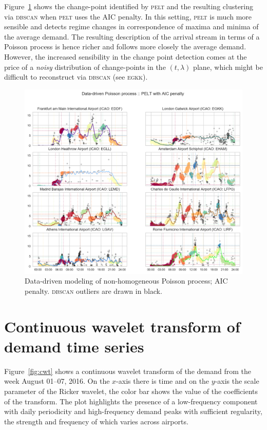 \documentclass[]{elsarticle}
\newcommand{\PELT}{\textsc{pelt}}
\newcommand{\DBSCAN}{\textsc{dbscan}}
\newcommand{\airp}[1]{\textcolor{#1}{\textsc{#1}}}
\begin{document}
  Figure~\ref{fig:DD_AIC} shows the change-point identified by \PELT{} and the resulting clustering via \DBSCAN{} when \PELT{} uses the \ac{AIC} penalty.
  In this setting, \PELT{} is much more sensible and detects regime changes in correspondence of maxima and minima of the average demand.
  The resulting description of the arrival stream in terms of a Poisson process is hence richer and follows more closely the average demand.
  However, the increased sensibility in the change point detection comes at the price of a \emph{noisy} distribution of change-points in the \((t,\lambda)\) plane, which might be difficult to reconstruct via \DBSCAN{} (see \airp{egkk}).

  \begin{figure}
      \includegraphics[width=\textwidth]{DDPoisson_AIC}
      \caption{Data-driven modeling of non-homogeneous Poisson process; \ac{AIC} penalty. \DBSCAN{} outliers are drawn in black.}\label{fig:DD_AIC}
  \end{figure}

\section{Continuous wavelet transform of demand time series}\label{sec:appc}

Figure~\ref{fig:cwt} shows a continuous wavelet transform of the demand from the week August 01--07, 2016.
On the \(x\)-axis there is time and on the \(y\)-axis the scale parameter of the Ricker wavelet, the color bar shows the value of the coefficients of the transform. The plot highlights the presence of a low-frequency component with daily periodicity and high-frequency demand peaks with sufficient regularity, the strength and frequency of which varies across airports.
\end{document}
